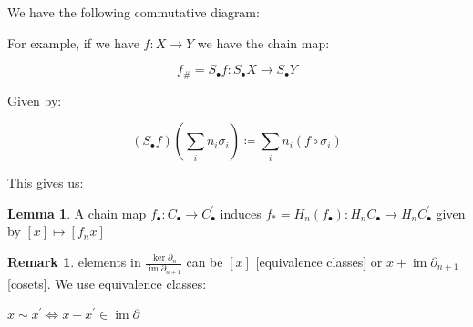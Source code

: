 \documentclass{article}
\theoremstyle{definition}
\newtheorem{lemma}[theorem]{Lemma}
\newtheorem*{remark}{Remark}
\begin{document}
    We have the following commutative diagram:

    \begin{center}
    \end{center}

    For example, if we have \(f: X \to Y\) we have the chain map:

    \[
        f_\# = S_\bullet f : S_\bullet X \to S_\bullet Y
    \]

    Given by:

    \[
        (S_{\bullet} f) \left( \sum_{i} n_i \sigma_i \right) \coloneqq \sum_{i} n_i (f \circ \sigma_i)
    \]


    This gives us:

    \begin{center}
    \end{center}

    \begin{lemma}
        A chain map \(f_\bullet: C_\bullet \to C_\bullet^{\prime} \) induces \(f_{\ast} = H_n(f_\bullet) : H_n C_\bullet \to H_n C_\bullet^{\prime}\) given by \([x] \mapsto [f_n x]\)  
    \end{lemma}

    \begin{remark}
        elements in \(\frac{\ker \partial_n}{\operatorname{im} \partial_{n+1}}\) can be \([x]\) [equivalence classes] or \(x + \operatorname{im} \partial_{n+1}\) [cosets]. We use equivalence classes:

        \(x \sim x^{\prime} \iff x - x^{\prime} \in \operatorname{im} \partial\) 
    \end{remark}
\end{document}
